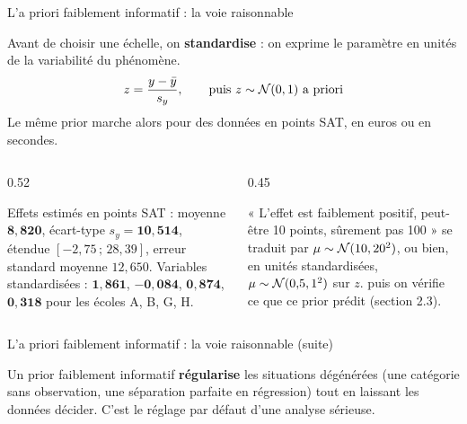 \begin{frame}{L'a priori faiblement informatif : la voie raisonnable}
\begin{kbox}
Avant de choisir une échelle, on \textbf{standardise} : on exprime le paramètre en
unités de la variabilité du phénomène.
\[
z = \frac{y - \bar y}{s_y}, \qquad \text{puis } z \sim \mathcal{N}(0, 1) \text{ a priori}
\]
Le même prior marche alors pour des données en points SAT, en euros ou en secondes.
\end{kbox}
\vspace{1mm}
\begin{columns}[t]
\begin{column}{0.52\textwidth}
\begin{ebox}
Effets estimés en points SAT : moyenne $\mathbf{8{,}820}$,
écart-type $s_y = \mathbf{10{,}514}$, étendue $[-2{,}75 \,;\, 28{,}39]$,
erreur standard moyenne $12{,}650$.
Variables standardisées : $\mathbf{1{,}861}$, $\mathbf{-0{,}084}$,
$\mathbf{0{,}874}$, $\mathbf{0{,}318}$ pour les écoles A, B, G, H.
\end{ebox}
\end{column}
\begin{column}{0.45\textwidth}
\begin{ebox}
« L'effet est faiblement positif, peut-être 10 points, sûrement pas
100 » se traduit par
$\mu \sim \mathcal{N}(10, 20^2)$, ou bien, en unités standardisées, $\mu \sim \mathcal{N}(0{,}5, 1^2)$ sur $z$.
puis on vérifie ce que ce prior prédit (section 2.3).
\end{ebox}
\end{column}
\end{columns}
\vspace{1mm}
\end{frame}

\begin{frame}{L'a priori faiblement informatif : la voie raisonnable (suite)}
\begin{wbox}
Un prior faiblement informatif \textbf{régularise} les situations dégénérées
(une catégorie sans observation, une séparation parfaite en régression) tout en
laissant les données décider. C'est le réglage par défaut d'une analyse sérieuse.
\end{wbox}
\end{frame}

